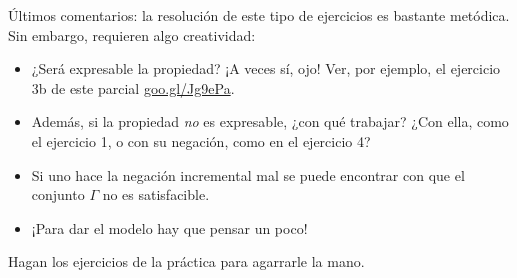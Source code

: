 \documentclass[10pt,a4paper]{article}
\begin{document}
Últimos comentarios: la resolución de este tipo de ejercicios es bastante metódica. Sin embargo, requieren algo creatividad:

\begin{itemize}
	\item ¿Será expresable la propiedad? ¡A veces sí, ojo! Ver, por ejemplo, el ejercicio 3b de este parcial \url{goo.gl/Jg9ePa}.
	\item Además, si la propiedad \emph{no} es expresable, ¿con qué trabajar? ¿Con ella, como el ejercicio 1, o con su negación, como en el ejercicio 4?
	\item Si uno hace la negación incremental mal se puede encontrar con que el conjunto $\Gamma$ no es satisfacible.
	\item ¡Para dar el modelo hay que pensar un poco!
\end{itemize}

Hagan los ejercicios de la práctica para agarrarle la mano.
\end{document}
